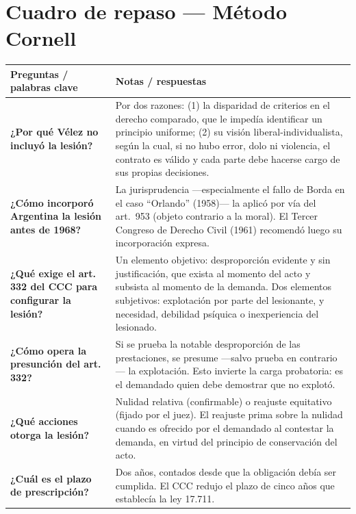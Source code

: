 \documentclass[12pt,oneside]{book}
\begin{document}
\section{Cuadro de repaso — Método Cornell}
\begin{longtable}{
    >{\raggedright\arraybackslash}p{}
    >{\raggedright\arraybackslash}p{}
}
\toprule
\textbf{Preguntas / palabras clave} & \textbf{Notas / respuestas} \\
\midrule
\endhead

\textbf{¿Por qué Vélez no incluyó la lesión?} &
Por dos razones: (1) la disparidad de criterios en el derecho comparado, que le impedía identificar un principio uniforme; (2) su visión liberal-individualista, según la cual, si no hubo error, dolo ni violencia, el contrato es válido y cada parte debe hacerse cargo de sus propias decisiones. \\

\textbf{¿Cómo incorporó Argentina la lesión antes de 1968?} &
La jurisprudencia —especialmente el fallo de Borda en el caso ``Orlando'' (1958)— la aplicó por vía del art.\ 953 (objeto contrario a la moral). El Tercer Congreso de Derecho Civil (1961) recomendó luego su incorporación expresa. \\

\textbf{¿Qué exige el art. 332 del CCC para configurar la lesión?} &
Un elemento objetivo: desproporción evidente y sin justificación, que exista al momento del acto y subsista al momento de la demanda. Dos elementos subjetivos: explotación por parte del lesionante, y necesidad, debilidad psíquica o inexperiencia del lesionado. \\

\textbf{¿Cómo opera la presunción del art. 332?} &
Si se prueba la notable desproporción de las prestaciones, se presume —salvo prueba en contrario— la explotación. Esto invierte la carga probatoria: es el demandado quien debe demostrar que no explotó. \\

\textbf{¿Qué acciones otorga la lesión?} &
Nulidad relativa (confirmable) o reajuste equitativo (fijado por el juez). El reajuste prima sobre la nulidad cuando es ofrecido por el demandado al contestar la demanda, en virtud del principio de conservación del acto. \\

\textbf{¿Cuál es el plazo de prescripción?} &
Dos años, contados desde que la obligación debía ser cumplida. El CCC redujo el plazo de cinco años que establecía la ley 17.711. \\


\end{longtable}
\end{document}
